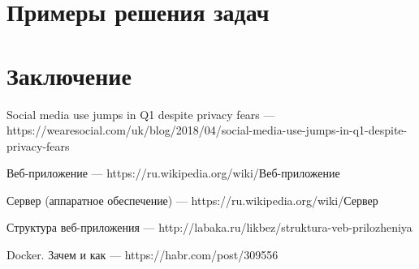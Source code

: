 \documentclass[14pt,a4paper]{scrartcl}
\begin{document}
    \newpage
    \section[Примеры решения задач]{Примеры решения задач}

    \newpage
    \section[Заключение]{Заключение}

    \newpage
    \begin{thebibliography}{9}
        Social media use jumps in Q1 despite privacy fears
        \newblock --- https://wearesocial.com/uk/blog/2018/04/social-media-use-jumps-in-q1-despite-privacy-fears

        Веб-приложение
        \newblock --- https://ru.wikipedia.org/wiki/Веб-приложение

        Сервер (аппаратное обеспечение)
        \newblock --- https://ru.wikipedia.org/wiki/Сервер

        Структура веб-приложения
        \newblock --- http://labaka.ru/likbez/struktura-veb-prilozheniya

        Docker. Зачем и как
        \newblock --- https://habr.com/post/309556

    \end{thebibliography}
\end{document}
